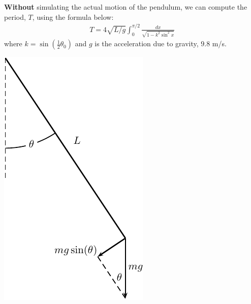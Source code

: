 \begin{enumerate}[1.]
\begin{Question}
\begin{minipage}[h]{0.6\linewidth}
{\bf Without} simulating the actual motion of the pendulum, we can
compute the period, $T$, using the formula below:
\begin{align*}
  T = 4 \sqrt{L/g} \int_0^{\pi/2} \frac{dx}{\sqrt{1 - k^2 \sin^2 x}}
\end{align*}
where $k = \sin\left(\frac{1}{2} \theta_0\right)$ and $g$ is the
acceleration due to gravity, $9.8 $ m/s.  
    \end{minipage} \hfill
    \begin{minipage}[h]{0.25\linewidth}
     \includegraphics[width=1.0\linewidth]{graphics/Week09_Pendulum/pendulum_diagram}
    \end{minipage}


\end{Question}
\end{enumerate}
